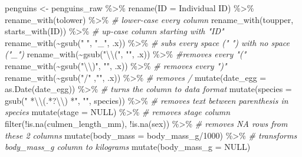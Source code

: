 \documentclass[
]{book}
\newenvironment{Shaded}{\begin{snugshade}}{\end{snugshade}}
\newcommand{\AttributeTok}[1]{\textcolor[rgb]{0.77,0.63,0.00}{#1}}
\newcommand{\CommentTok}[1]{\textcolor[rgb]{0.56,0.35,0.01}{\textit{#1}}}
\newcommand{\ConstantTok}[1]{\textcolor[rgb]{0.00,0.00,0.00}{#1}}
\newcommand{\DecValTok}[1]{\textcolor[rgb]{0.00,0.00,0.81}{#1}}
\newcommand{\FunctionTok}[1]{\textcolor[rgb]{0.00,0.00,0.00}{#1}}
\newcommand{\NormalTok}[1]{#1}
\newcommand{\OtherTok}[1]{\textcolor[rgb]{0.56,0.35,0.01}{#1}}
\newcommand{\SpecialCharTok}[1]{\textcolor[rgb]{0.00,0.00,0.00}{#1}}
\newcommand{\StringTok}[1]{\textcolor[rgb]{0.31,0.60,0.02}{#1}}
\begin{document}
\begin{Shaded}
\begin{Highlighting}[]
\NormalTok{penguins }\OtherTok{\textless{}{-}}\NormalTok{ penguins\_raw }\SpecialCharTok{\%\textgreater{}\%}
  \FunctionTok{rename}\NormalTok{(}\StringTok{\textquotesingle{}ID\textquotesingle{}} \OtherTok{=} \StringTok{\textquotesingle{}Individual ID\textquotesingle{}}\NormalTok{) }\SpecialCharTok{\%\textgreater{}\%} 
  \FunctionTok{rename\_with}\NormalTok{(tolower) }\SpecialCharTok{\%\textgreater{}\%}  \CommentTok{\# lower{-}case every column}
  \FunctionTok{rename\_with}\NormalTok{(toupper, }\FunctionTok{starts\_with}\NormalTok{(}\StringTok{\textquotesingle{}ID\textquotesingle{}}\NormalTok{)) }\SpecialCharTok{\%\textgreater{}\%} \CommentTok{\# up{-}case column starting with "ID"}
  \FunctionTok{rename\_with}\NormalTok{(}\SpecialCharTok{\textasciitilde{}}\FunctionTok{gsub}\NormalTok{(}\StringTok{" "}\NormalTok{, }\StringTok{"\_"}\NormalTok{, .x))  }\SpecialCharTok{\%\textgreater{}\%} \CommentTok{\# subs every space (" ") with no space ("\_")}
  \FunctionTok{rename\_with}\NormalTok{(}\SpecialCharTok{\textasciitilde{}}\FunctionTok{gsub}\NormalTok{(}\StringTok{"}\SpecialCharTok{\textbackslash{}\textbackslash{}}\StringTok{("}\NormalTok{, }\StringTok{""}\NormalTok{, .x)) }\SpecialCharTok{\%\textgreater{}\%}  \CommentTok{\#removes every "("}
  \FunctionTok{rename\_with}\NormalTok{(}\SpecialCharTok{\textasciitilde{}}\FunctionTok{gsub}\NormalTok{(}\StringTok{"}\SpecialCharTok{\textbackslash{}\textbackslash{}}\StringTok{)"}\NormalTok{, }\StringTok{""}\NormalTok{, .x))  }\SpecialCharTok{\%\textgreater{}\%} \CommentTok{\# removes every ")"}
  \FunctionTok{rename\_with}\NormalTok{(}\SpecialCharTok{\textasciitilde{}}\FunctionTok{gsub}\NormalTok{(}\StringTok{"/"}\NormalTok{ ,}\StringTok{""}\NormalTok{, .x)) }\SpecialCharTok{\%\textgreater{}\%} \CommentTok{\# removes /}
  \FunctionTok{mutate}\NormalTok{(}\AttributeTok{date\_egg =} \FunctionTok{as.Date}\NormalTok{(date\_egg)) }\SpecialCharTok{\%\textgreater{}\%}  \CommentTok{\# turns the column to data format}
  \FunctionTok{mutate}\NormalTok{(}\AttributeTok{species =} \FunctionTok{gsub}\NormalTok{(}\StringTok{" *}\SpecialCharTok{\textbackslash{}\textbackslash{}}\StringTok{(.*?}\SpecialCharTok{\textbackslash{}\textbackslash{}}\StringTok{) *"}\NormalTok{, }\StringTok{""}\NormalTok{, species)) }\SpecialCharTok{\%\textgreater{}\%} \CommentTok{\# removes text between parenthesis in species}
  \FunctionTok{mutate}\NormalTok{(}\AttributeTok{stage =} \ConstantTok{NULL}\NormalTok{) }\SpecialCharTok{\%\textgreater{}\%}  \CommentTok{\# removes stage column}
  \FunctionTok{filter}\NormalTok{(}\SpecialCharTok{!}\FunctionTok{is.na}\NormalTok{(culmen\_length\_mm), }\SpecialCharTok{!}\FunctionTok{is.na}\NormalTok{(sex)) }\SpecialCharTok{\%\textgreater{}\%}   \CommentTok{\# removes NA rows from these 2 columns}
  \FunctionTok{mutate}\NormalTok{(}\AttributeTok{body\_mass =}\NormalTok{ body\_mass\_g}\SpecialCharTok{/}\DecValTok{1000}\NormalTok{) }\SpecialCharTok{\%\textgreater{}\%}   \CommentTok{\# transforms body\_mass\_g column to kilograms}
  \FunctionTok{mutate}\NormalTok{(}\AttributeTok{body\_mass\_g =} \ConstantTok{NULL}\NormalTok{)}
\end{Highlighting}
\end{Shaded}
\end{document}
